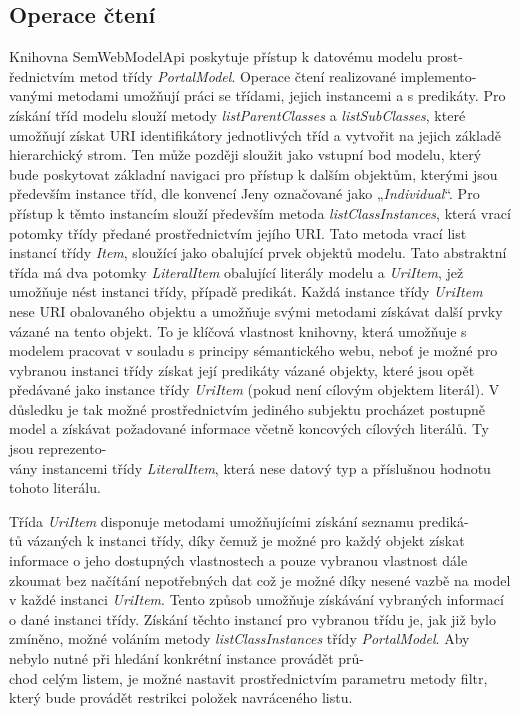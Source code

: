 \documentclass{projekt}
\begin{document}
\subsection{Operace čtení}
\hspace{0.65cm}Knihovna SemWebModelApi poskytuje přístup k datovému modelu prost-\\řednictvím metod třídy {\it PortalModel}. Operace čtení realizované implemento-\\vanými metodami umožňují práci se třídami, jejich instancemi a s predikáty. Pro získání tříd modelu slouží metody {\it listParentClasses} a {\it listSubClasses}, které umožňují získat URI identifikátory jednotlivých tříd a vytvořit na jejich základě hierarchický strom. Ten může později sloužit jako vstupní bod modelu, který bude poskytovat základní navigaci pro přístup k dalším objektům, kterými jsou především instance tříd, dle konvencí Jeny označované jako „{\it Individual}“. Pro přístup k těmto instancím slouží především metoda {\it listClassInstances}, která vrací potomky třídy předané prostřednictvím jejího URI. Tato metoda vrací list instancí třídy {\it Item}, sloužící jako obalující prvek objektů modelu. Tato abstraktní třída má dva potomky {\it LiteralItem} obalující literály modelu a {\it UriItem}, jež umožňuje nést instanci třídy, případě predikát. Každá instance třídy {\it UriItem} nese URI obalovaného objektu a umožňuje svými metodami získávat další prvky vázané na tento objekt. To je klíčová vlastnost knihovny, která umožňuje s  modelem pracovat v souladu s principy sémantického webu, neboť je možné pro vybranou instanci třídy získat její predikáty vázané objekty, které jsou opět předávané jako instance třídy {\it UriItem} (pokud není cílovým objektem literál). V důsledku je tak možné prostřednictvím jediného subjektu procházet postupně model a získávat požadované informace včetně koncových cílových literálů. Ty jsou reprezento-\\vány instancemi třídy {\it LiteralItem}, která nese datový typ a příslušnou hodnotu tohoto literálu.

Třída {\it UriItem} disponuje metodami umožňujícími získání seznamu prediká-\\tů vázaných k instanci třídy, díky čemuž je možné pro každý objekt získat informace o jeho dostupných vlastnostech a pouze vybranou vlastnost dále zkoumat bez načítání nepotřebných dat což je možné díky nesené vazbě na model v každé instanci {\it UriItem}. Tento způsob umožňuje získávání vybraných informací o dané instanci třídy. Získání těchto instancí pro vybranou třídu je, jak již bylo zmíněno, možné voláním metody {\it listClassInstances} třídy {\it PortalModel}. Aby nebylo nutné při hledání konkrétní instance provádět prů-\\chod celým listem, je možné nastavit prostřednictvím parametru metody filtr, který bude provádět restrikci položek navráceného listu. 
\end{document}
